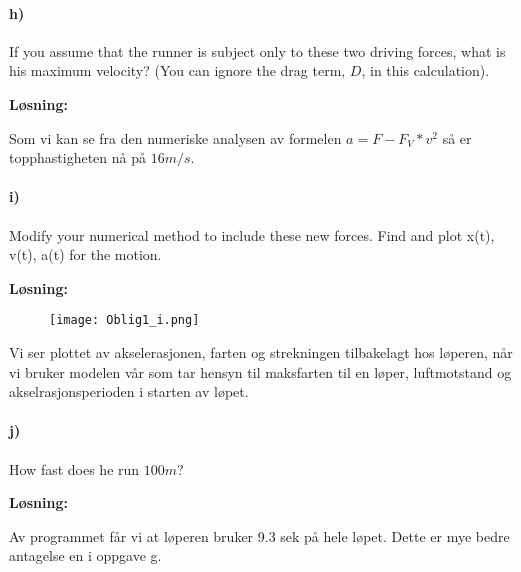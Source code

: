 \documentclass[11pt, A4paper,norsk]{article}
\begin{document}
		\paragraph{h)}
			\begin{flushleft}
If you assume that the runner is subject only to these two driving forces, what is his maximum velocity? (You can ignore the drag term, $D$, in this calculation).
			\end{flushleft}
			\begin{flushleft}
\textbf{Løsning:}
			\end{flushleft}
			\begin{flushleft}

Som vi kan se fra den numeriske analysen av formelen $a = F - F_{V}*v^{2}$ så er topphastigheten nå på $16m/s$.
			\end{flushleft}
		\paragraph{i)}
			\begin{flushleft}
Modify your numerical method to include these new forces. Find and plot x(t), v(t), a(t) for the motion.
			\end{flushleft}
			\begin{flushleft}
\textbf{Løsning:}
			\end{flushleft}
				\begin{flushleft}

				\begin{figure}[H]
\texttt{[image: Oblig1\_i.png]}
				\end{figure}
Vi ser plottet av akselerasjonen, farten og strekningen tilbakelagt hos løperen, når vi bruker modelen vår som tar hensyn til maksfarten til en løper, luftmotstand og akselrasjonsperioden i starten av løpet.
				\end{flushleft}
		\paragraph{j)}
			\begin{flushleft}
How fast does he run $100m$?
			\end{flushleft}
			\begin{flushleft}
\textbf{Løsning:}
			\end{flushleft}
				\begin{flushleft}

Av programmet får vi at løperen bruker 9.3 sek på hele løpet. Dette er mye bedre antagelse en i oppgave g.
				\end{flushleft}
\end{document}
